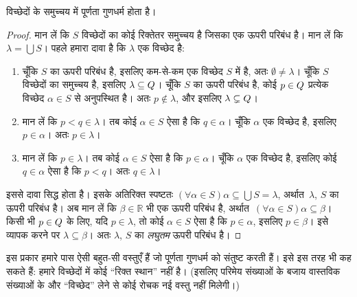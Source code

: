 \documentclass[../../../include/open-logic-section]{subfiles}
\begin{document}
\begin{thm}
विच्छेदों के समुच्चय में पूर्णता गुणधर्म होता है।
\end{thm}

\begin{proof}
मान लें कि $S$ विच्छेदों का कोई रिक्तेतर समुच्चय है जिसका एक ऊपरी परिबंध है।
मान लें कि $\lambda
= \bigcup S$।
पहले हमारा दावा है कि $\lambda$ एक विच्छेद है:
\begin{enumerate}
\item चूँकि $S$ का ऊपरी परिबंध है, इसलिए कम-से-कम एक विच्छेद $S$ में है, अतः
$\emptyset \neq \lambda$। चूँकि $S$ विच्छेदों का समुच्चय है, इसलिए $\lambda
\subseteq Q$। चूँकि $S$ का ऊपरी परिबंध है, कोई $p \in Q$ प्रत्येक
विच्छेद $\alpha \in S$ से अनुपस्थित है। अतः $p\notin \lambda$, और इसलिए
$\lambda \subsetneq Q$।
\item मान लें कि $p < q \in \lambda$। तब कोई $\alpha \in S$ ऐसा है कि
$q \in \alpha$। चूँकि $\alpha$ एक विच्छेद है, इसलिए $p \in \alpha$। अतः
$p \in \lambda$।
\item मान लें कि $p \in \lambda$। तब कोई $\alpha \in S$ ऐसा है कि
$p \in \alpha$। चूँकि $\alpha$ एक विच्छेद है, इसलिए कोई $q \in
\alpha$ ऐसा है कि $p < q$। अतः $q \in \lambda$।
\end{enumerate}
इससे दावा सिद्ध होता है। इसके अतिरिक्त स्पष्टतः $(\forall \alpha \in S)\alpha
\subseteq \bigcup S = \lambda$, अर्थात\ $\lambda$, $S$ का ऊपरी परिबंध है। अब मान लें कि $\beta \in \mathbb{R}$ भी एक ऊपरी परिबंध है, अर्थात\ $(\forall \alpha \in S)\alpha \subseteq \beta$। किसी भी $p \in Q$ के लिए, यदि $p \in \lambda$, तो कोई $\alpha \in S$ ऐसा है कि $p \in \alpha$, इसलिए $p \in \beta$। इसे व्यापक करने पर $\lambda \subseteq \beta$। अतः $\lambda$, $S$ का \emph{लघुतम} ऊपरी परिबंध है।
\end{proof}

इस प्रकार हमारे पास ऐसी बहुत-सी वस्तुएँ हैं जो पूर्णता गुणधर्म को संतुष्ट करती
हैं। इसे इस तरह भी कह सकते हैं: हमारे विच्छेदों में कोई ``रिक्त स्थान'' नहीं
है। (इसलिए परिमेय संख्याओं के बजाय वास्तविक संख्याओं के और ``विच्छेद'' लेने
से कोई रोचक नई वस्तु नहीं मिलेगी।)
\end{document}
